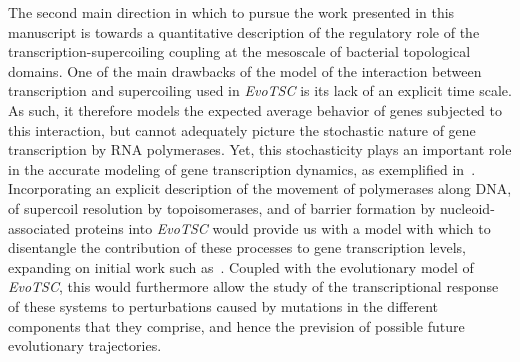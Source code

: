 The second main direction in which to pursue the work presented in this manuscript is towards a quantitative description of the regulatory role of the transcription-supercoiling coupling at the mesoscale of bacterial topological domains.
One of the main drawbacks of the model of the interaction between transcription and supercoiling used in \emph{EvoTSC} is its lack of an explicit time scale.
As such, it therefore models the expected average behavior of genes subjected to this interaction, but cannot adequately picture the stochastic nature of gene transcription by RNA polymerases.
Yet, this stochasticity plays an important role in the accurate modeling of gene transcription dynamics, as exemplified in~\cite{sevier2021}.
Incorporating an explicit description of the movement of polymerases along DNA, of supercoil resolution by topoisomerases, and of barrier formation by nucleoid-associated proteins into \emph{EvoTSC} would provide us with a model with which to disentangle the contribution of these processes to gene transcription levels, expanding on initial work such as~\cite{elhoudaigui2019}.
Coupled with the evolutionary model of \emph{EvoTSC}, this would furthermore allow the study of the transcriptional response of these systems to perturbations caused by mutations in the different components that they comprise, and hence the prevision of possible future evolutionary trajectories.
